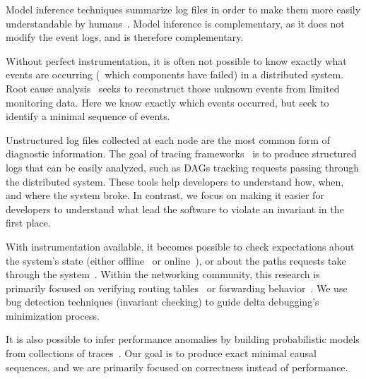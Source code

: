 { Model inference techniques summarize log files
in order to make them more easily understandable by
humans~\cite{ernst2001dynamically,synoptic,csight,biermann1972synthesis,lorenzoli2008automatic,lou2010mining}.
Model inference is complementary, as it does not modify the event logs, and is therefore complementary.

Without perfect instrumentation,
it is often not possible to know exactly what events are occurring (\eg~which
 components have failed) in a
 distributed system. Root cause analysis~\cite{yemini1996,Kandula:2009:DDE:1592568.1592597}
 seeks to reconstruct those unknown events from limited monitoring data.
 Here we know exactly which events occurred, but
 seek to identify a minimal sequence of events.

 Unstructured
log files collected at each node are the most common form of diagnostic information. The goal of
tracing frameworks~\cite{pip,fonseca2007x,Chen02pinpoint:problem,ndb14,barham2004using}
is to produce structured logs that can be easily analyzed, such as DAGs tracking
requests passing through the distributed system. These tools help developers to understand
how, when, and where the system broke. In contrast, we focus on making it
easier for developers to understand what lead the software
to violate an invariant in the first place.

 With instrumentation available, it becomes possible
to check expectations about the
system's state (either offline~\cite{Liu07widschecker} or online~\cite{d3s}), or about the paths requests take through
the system~\cite{pip}. Within the networking community, this research is
primarily focused on verifying routing tables~\cite{hsa,hsa_realtime,anteater,khurshid2012veriflow}
or forwarding behavior~\cite{Zeng:2012:ATP:2413176.2413205,libra}.
We use bug detection techniques (invariant checking) to guide delta debugging's minimization
process.

It is also possible to infer
 performance anomalies by building probabilistic models from
 collections of traces~\cite{barham2004using,Chen02pinpoint:problem}.
 Our goal is to produce exact minimal causal sequences, and we are primarily focused on
 correctness instead of performance.



}
